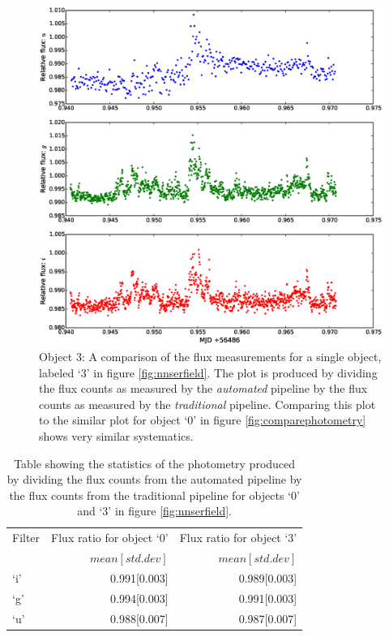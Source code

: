 \begin{figure}
\centering
\includegraphics[width=140mm]{images/compare_photometry_2.eps}
\caption{Object 3: A comparison of the flux measurements for a single object, labeled `3' in figure \ref{fig:nnserfield}. The plot is produced by dividing the flux counts as measured by the \emph{automated} pipeline by the flux counts as measured by the \emph{traditional} pipeline. Comparing this plot to the similar plot for object `0' in figure \ref{fig:comparephotometry} shows very similar systematics.}
\label{fig:comparephotometry2}
\end{figure}

\begin{table}
  \centering
  \caption{Table showing the statistics of the photometry produced by dividing the flux counts from the automated pipeline by the flux counts from the traditional pipeline for objects `0'  and `3' in figure \ref{fig:nnserfield}.}
  \begin{tabular}{l r r }
    \hline
    Filter & Flux ratio for object `0' & Flux ratio  for object `3'\\
           &  $mean[std. dev]$ &  $mean[std. dev]$\\
    \hline
    `i'    & 0.991[0.003]  & 0.989[0.003] \\
    `g'    & 0.994[0.003] & 0.991[0.003]\\
    `u'    & 0.988[0.007] & 0.987[0.007]\\
    \hline
   \end{tabular}
  \label{tab:differential}
  
\end{table}

